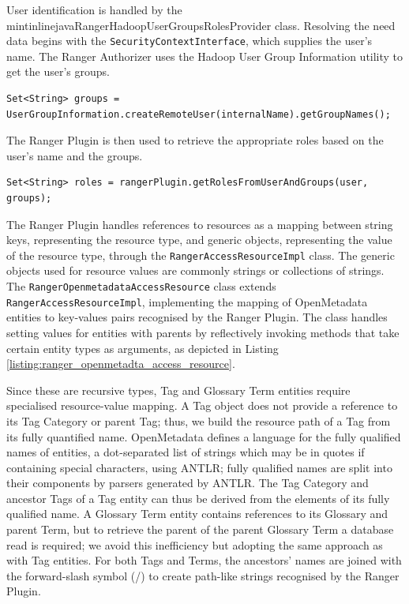 User identification is handled by the mintinline{java}{RangerHadoopUserGroupsRolesProvider} class. Resolving the need data begins with the \texttt{SecurityContextInterface}, which supplies the user's name. The Ranger Authorizer uses the Hadoop User Group Information utility to get the user's groups.

\begin{verbatim}
Set<String> groups = UserGroupInformation.createRemoteUser(internalName).getGroupNames();
\end{verbatim}

The Ranger Plugin is then used to retrieve the appropriate roles based on the user's name and the groups.

\begin{verbatim}
Set<String> roles = rangerPlugin.getRolesFromUserAndGroups(user, groups);
\end{verbatim}

The Ranger Plugin handles references to resources as a mapping between string keys, representing the resource type, and generic objects, representing the value of the resource type, through the \texttt{RangerAccessResourceImpl} class. The generic objects used for resource values are commonly strings or collections of strings. The \texttt{RangerOpenmetadataAccessResource} class extends \texttt{RangerAccessResourceImpl}, implementing the mapping of OpenMetadata entities to key-values pairs recognised by the Ranger Plugin. The class handles setting values for entities with parents by reflectively invoking methods that take certain entity types as arguments, as depicted in Listing \ref{listing:ranger_openmetadta_access_resource}.

Since these are recursive types, Tag and Glossary Term entities require specialised resource-value mapping. A Tag object does not provide a reference to its Tag Category or parent Tag; thus, we build the resource path of a Tag from its fully quantified name. OpenMetadata defines a language for the fully qualified names of entities, a dot-separated list of strings which may be in quotes if containing special characters, using ANTLR; fully qualified names are split into their components by parsers generated by ANTLR. The Tag Category and ancestor Tags of a Tag entity can thus be derived from the elements of its fully qualified name. A Glossary Term entity contains references to its Glossary and parent Term, but to retrieve the parent of the parent Glossary Term a database read is required; we avoid this inefficiency but adopting the same approach as with Tag entities. For both Tags and Terms, the ancestors' names are joined with the forward-slash symbol (/) to create path-like strings recognised by the Ranger Plugin.

